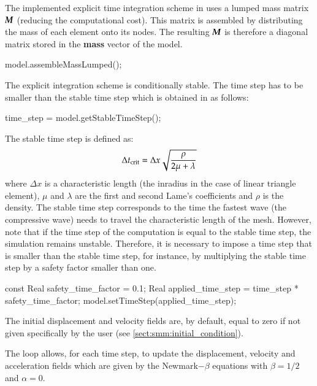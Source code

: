 The implemented explicit  time integration scheme in \akantu  uses a lumped mass
matrix $\boldsymbol{M}$ (reducing the computational  cost). This matrix is assembled by
distributing the mass of each element onto its nodes. The resulting $\boldsymbol{M}$ is
therefore a diagonal matrix stored in the \textbf{mass} vector of the model.


\begin{cpp}
  model.assembleMassLumped();
\end{cpp}

The explicit integration scheme is conditionally stable. The time step has to be
smaller than the stable time step which is obtained in \akantu as follows:

\begin{cpp}
  time_step = model.getStableTimeStep();
\end{cpp}

The stable time step is defined as:
\begin{equation}\label{eqn:smm:explicit:stabletime}
  \Delta t_{{\mathrm{crit}}} = \Delta x \sqrt{\frac{\rho}{2 \mu + \lambda}}
\end{equation}
where $\Delta  x$ is a  characteristic length (\eg  the inradius in the  case of
linear triangle  element), $\mu$ and $\lambda$  are the first  and second Lame's
coefficients and $\rho$ is the density.  The stable time step corresponds to the
time the fastest wave (the  compressive wave) needs to travel the characteristic
length of the mesh.   However, note that if the time step  of the computation is
equal to the stable time step, the simulation remains unstable. Therefore, it is
necessary to impose a  time step that is smaller than the  stable time step, for
instance, by  multiplying the stable time  step by a safety  factor smaller than
one.

\begin{cpp}
  const Real safety_time_factor = 0.1;
  Real applied_time_step = time_step * safety_time_factor;
  model.setTimeStep(applied_time_step);
\end{cpp}

The initial displacement  and velocity fields are, by default,  equal to zero if
not given specifically by the user (see \ref{sect:smm:initial_condition}).

The loop  allows, for each time  step, to update the  displacement, velocity and
acceleration  fields  which are  given  by  the  Newmark$-\beta$ equations  with
$\beta=1/2$ and $\alpha=0$.

